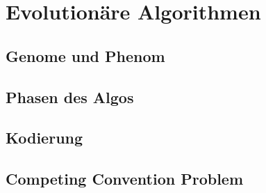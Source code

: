 \section{Evolutionäre Algorithmen}
\subsection{Genome und Phenom}
\subsection{Phasen des Algos}
\subsection{Kodierung}
\subsection{Competing Convention Problem}